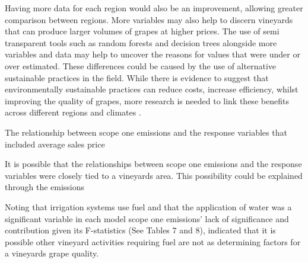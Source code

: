 \documentclass[review,12pt,authoryear]{elsarticle}
\begin{document}
\begin{linenumbers}
Having more data for each region would also be an improvement, allowing greater comparison between regions. More variables may also help to discern vineyards that can produce larger volumes of grapes at higher prices. The use of semi transparent tools such as random forests and decision trees alongside more variables and data may help to uncover the reasons for values that were under or over estimated. These differences could be caused by the use of alternative sustainable practices in the field. While there is evidence to suggest that environmentally sustainable practices can reduce costs, increase efficiency, whilst improving the quality of grapes, more research is needed to link these benefits across different regions and climates \citep{baianoOverviewSustainabilityWine2021,marianiSustainableWinegrowingCurrent2015,montalvo-falconSustainabilityResearchWine2023}.

The relationship between scope one emissions and the response variables that included average sales price

It is possible that the relationships between scope one emissions and the response variables were closely tied to a vineyards area. This possibility could be explained through the emissions 

Noting that irrigation systems use fuel
and that the application of water was a significant variable in each model
scope one emissions' lack of significance and contribution given its F-statistics (See Tables 7 and 8),
 indicated that it is possible other vineyard activities requiring fuel are not as determining factors for a vineyards grape quality.




 \appendix



\end{linenumbers}
\end{document}
